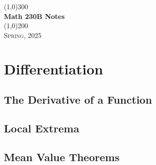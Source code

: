 \documentclass[a4paper, openany]{book}
\begin{document}
\begin{titlepage}
    \begin{center}
        \line(1,0){300} \\
        [0.25in]
        \huge{\bfseries Math 230B Notes} \\
        [2mm]
        \line(1,0){200} \\
        [1.5cm]
        \textsc{\LARGE Spring, 2025}
    \end{center}
\end{titlepage}

\tableofcontents
\setcounter{section}{0}

\chapter{Differentiation}

\section{The Derivative of a Function}

\newpage

\section{Local Extrema}

\newpage

\section{Mean Value Theorems}

\newpage
\end{document}
